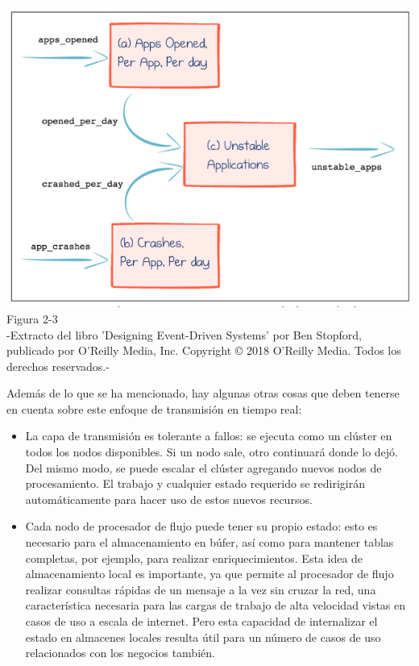 \documentclass{article}
\begin{document}
\begin{center}
    \includegraphics[scale=0.8]{figure2.3.png}
    Figura 2-3\\
    -Extracto del libro 'Designing Event-Driven Systems' por Ben Stopford, publicado por O'Reilly Media, Inc. Copyright © 2018 O'Reilly Media. Todos los derechos reservados.-
\end{center}
Además de lo que se ha mencionado, hay algunas otras cosas que deben tenerse en cuenta sobre este enfoque de transmisión en tiempo real:
\begin{itemize}
    \item La capa de transmisión es tolerante a fallos: se ejecuta como un clúster en todos los nodos disponibles. Si un nodo sale, otro continuará donde lo dejó. Del mismo modo, se puede escalar el clúster agregando nuevos nodos de procesamiento. El trabajo y cualquier estado requerido se redirigirán automáticamente para hacer uso de estos nuevos recursos.
    \item Cada nodo de procesador de flujo puede tener su propio estado: esto es necesario para el almacenamiento en búfer, así como para mantener tablas completas, por ejemplo, para realizar enriquecimientos. Esta idea de almacenamiento local es importante, ya que permite al procesador de flujo realizar consultas rápidas de un mensaje a la vez sin cruzar la red, una característica necesaria para las cargas de trabajo de alta velocidad vistas en casos de uso a escala de internet. Pero esta capacidad de internalizar el estado en almacenes locales resulta útil para un número de casos de uso relacionados con los negocios también.
\end{itemize}
\end{document}
